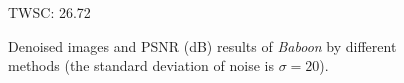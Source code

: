 \begin{figure}
\begin{adjustwidth}{-2cm}{}
{\begin{minipage}[t]{0.19\textwidth}
{\footnotesize TWSC: 26.72}
\end{minipage}
}
\caption{Denoised images and PSNR (dB) results of \textsl{Baboon} by different methods (the standard deviation of noise is $\sigma=20$).}
    \label{fig5-2}
\end{adjustwidth}
\end{figure}



\begin{figure}
\begin{adjustwidth}{-2cm}{}
    \centering
{}
\end{adjustwidth}
\end{figure}
